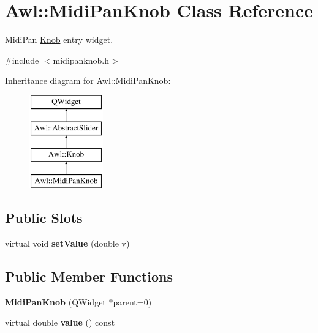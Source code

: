 \hypertarget{class_awl_1_1_midi_pan_knob}{}\section{Awl\+:\+:Midi\+Pan\+Knob Class Reference}
\label{class_awl_1_1_midi_pan_knob}


Midi\+Pan \hyperlink{class_awl_1_1_knob}{Knob} entry widget.  




{\ttfamily \#include $<$midipanknob.\+h$>$}

Inheritance diagram for Awl\+:\+:Midi\+Pan\+Knob\+:\begin{figure}[H]
\begin{center}
\leavevmode
\includegraphics[height=4.000000cm]{class_awl_1_1_midi_pan_knob}
\end{center}
\end{figure}
\subsection*{Public Slots}
\begin{DoxyCompactItemize}
\item 
\mbox{\label{class_awl_1_1_midi_pan_knob_a4ff6f8dddfd0765b5fe82ecedbf2e9bc}} 
virtual void {\bfseries set\+Value} (double v)
\end{DoxyCompactItemize}
\subsection*{Public Member Functions}
\begin{DoxyCompactItemize}
\item 
\mbox{\label{class_awl_1_1_midi_pan_knob_a4b83c919cad6e06b4849b84f17ba47d7}} 
{\bfseries Midi\+Pan\+Knob} (Q\+Widget $\ast$parent=0)
\item 
\mbox{\label{class_awl_1_1_midi_pan_knob_ac8f0050f9991555a1b132c5901ede91b}} 
virtual double {\bfseries value} () const
\end{DoxyCompactItemize}
